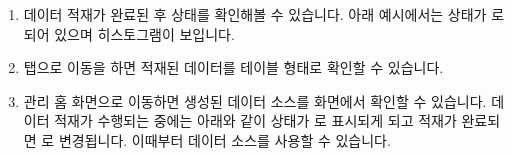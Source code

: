 \documentclass[letterpaper,10pt,english]{sphinxmanual}
\begin{document}
\begin{enumerate}
\begin{quote}
\begin{figure}[H]
\centering

\noindent{}
\end{figure}
\end{quote}

\item {} 
데이터 적재가 완료된 후 상태를 확인해볼 수 있습니다. 아래 예시에서는 상태가 로 되어 있으며 히스토그램이 보입니다.
\begin{quote}

\begin{figure}[H]
\centering

\noindent{}
\end{figure}
\end{quote}

\item {} 
 탭으로 이동을 하면 적재된 데이터를 테이블 형태로 확인할 수 있습니다.
\begin{quote}

\begin{figure}[H]
\centering

\noindent{}
\end{figure}
\end{quote}

\item {} 
 관리 홈 화면으로 이동하면 생성된 데이터 소스를 화면에서 확인할 수 있습니다. 데이터 적재가 수행되는 중에는 아래와 같이 상태가 로 표시되게 되고 적재가 완료되면 로 변경됩니다. 이때부터 데이터 소스를 사용할 수 있습니다.
\begin{quote}

\begin{figure}[H]
\centering

\noindent{}
\end{figure}
\end{quote}

\end{enumerate}
\end{document}
